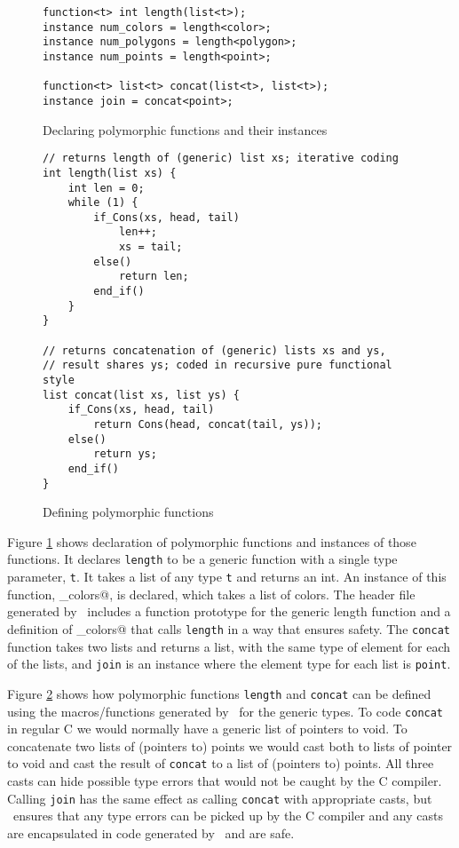 \begin{figure}[!ht]
\begin{verbatim}
function<t> int length(list<t>);
instance num_colors = length<color>;
instance num_polygons = length<polygon>;
instance num_points = length<point>;

function<t> list<t> concat(list<t>, list<t>);
instance join = concat<point>;
\end{verbatim}
\caption{Declaring polymorphic functions and their instances}
\label{fig:finsts}
\end{figure}

\begin{figure}[!ht]
\begin{verbatim}
// returns length of (generic) list xs; iterative coding
int length(list xs) {
    int len = 0;
    while (1) {
        if_Cons(xs, head, tail)
            len++;
            xs = tail;
        else()
            return len;
        end_if()
    }
}

// returns concatenation of (generic) lists xs and ys,
// result shares ys; coded in recursive pure functional style
list concat(list xs, list ys) {
    if_Cons(xs, head, tail)
        return Cons(head, concat(tail, ys));
    else()
        return ys;
    end_if()
}
\end{verbatim}
\caption{Defining polymorphic functions }
\label{fig:polyfn}
\end{figure}


Figure \ref{fig:finsts} shows declaration of polymorphic functions
and instances of those functions. It declares \texttt{length} to be a
generic function with a single type parameter, \texttt{t}.  It takes
a list of any type \texttt{t} and returns an int. An instance of this
function, \verb@num_colors@, is declared, which takes a list of colors.
The header file generated by \adtpp\ includes a function prototype
for the generic length function and a definition of \verb@num_colors@
that calls \texttt{length} in a way that ensures
safety. The \texttt{concat} function takes two lists and returns a list,
with the same type of element for each of the lists, and \texttt{join}
is an instance where the element type for each list is \texttt{point}.

Figure \ref{fig:polyfn} shows how polymorphic functions \texttt{length}
and \texttt{concat} can be defined using the macros/functions generated
by \adtpp\ for the generic types.  To code \texttt{concat} in regular C
we would normally have a generic list of pointers to void.  To
concatenate two lists of (pointers to) points we would cast both to lists
of pointer to void and cast the result of \texttt{concat} to a list of
(pointers to) points.  All three casts can hide possible type errors
that would not be caught by the C compiler.  Calling \texttt{join} has
the same effect as calling \texttt{concat} with appropriate casts, but
\adtpp\ ensures that any type errors can be picked up by the C compiler
and any casts are encapsulated in code generated by \adtpp\ and are safe.

